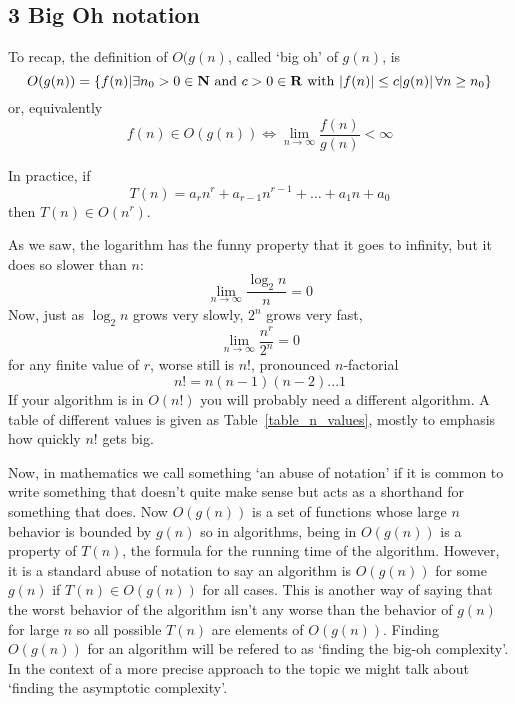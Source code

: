 \documentclass[11pt,a4paper]{scrartcl}
\begin{document}
\subsection*{3 Big Oh notation}

To recap, the definition of $O(g(n)$, called \lq{}big oh\rq{} of
$g(n)$, is
\begin{equation}
O(g(n))=\{f(n)| \exists n_0>0\in {\bf N}\mbox{ and }c>0\in {\bf R}\mbox{ with }|f(n)|\le c|g(n)|\,\forall n\ge n_0\}
\end{equation}
or, equivalently
\begin{equation}
f(n)\in O(g(n))\iff \lim_{n\rightarrow \infty}\frac{f(n)}{g(n)}<\infty
\end{equation}

In practice, if
\begin{equation}
T(n)=a_rn^r+a_{r-1}n^{r-1}+\ldots+a_1n+a_0
\end{equation}
then $T(n)\in O(n^r)$. 

As we saw, the logarithm has the funny property that it goes to infinity, but it
does so slower than $n$:
\begin{equation}
\lim_{n\rightarrow \infty}\frac{\log_2{n}}{n}=0
\end{equation}
Now, just as $\log_2{n}$ grows very slowly, $2^n$
grows very fast,
\begin{equation}
\lim_{n\rightarrow \infty}\frac{n^r}{2^n}=0
\end{equation}
for any finite value of $r$, worse still is $n!$, pronounced $n$-factorial
\begin{equation}
n!=n(n-1)(n-2) . . . 1
\end{equation}
If your algorithm is in $O(n!)$ you will probably need a different
algorithm. A table of different values is given as
Table~\ref{table_n_values}, mostly to emphasis how quickly $n!$ gets
big.

Now, in mathematics we call something \lq{}an abuse of notation\rq{}
if it is common to write something that doesn't quite make sense but
acts as a shorthand for something that does. Now $O(g(n))$ is a set of
functions whose large $n$ behavior is bounded by $g(n)$ so in
algorithms, being in $O(g(n))$ is a property of $T(n)$, the formula
for the running time of the algorithm. However, it is a standard abuse
of notation to say an algorithm is $O(g(n))$ for some $g(n)$ if
$T(n)\in O(g(n))$ for all cases. This is another way of saying that
the worst behavior of the algorithm isn't any worse than the behavior
of $g(n)$ for large $n$ so all possible $T(n)$ are elements of
$O(g(n))$. Finding $O(g(n))$ for an algorithm will be refered to as
\lq{}finding the big-oh complexity\rq{}. In the context of a more precise approach to the topic we might talk about \lq{}finding the asymptotic complexity\rq{}.
\end{document}
